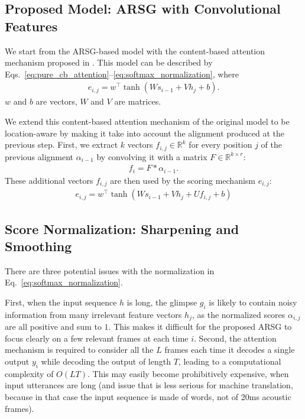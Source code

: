 \documentclass{article}
\begin{document}
\subsection{Proposed Model: ARSG with Convolutional Features}

We start from the ARSG-based model with the content-based attention mechanism
proposed in \cite{bahdanau_neural_2014}. This model can be described by
Eqs.~\eqref{eq:pure_cb_attention}--\eqref{eq:softmax_normalization}, where 
\begin{align}
e_{i,j} = w^\top \tanh(W s_{i-1} + V h_j + b).
\label{eq:base_attention}
\end{align}
$w$ and $b$ are vectors, $W$ and $V$ are matrices. 





We extend this content-based attention mechanism of the original model to be
location-aware by making it take into account the alignment produced at the
previous step. First, we extract $k$ vectors $f_{i,j} \in \mathbb{R}^{k}$ for
every position $j$ of the previous alignment $\alpha_{i-1}$  by convolving it
with a matrix $F \in \mathbb{R}^{k \times r}$:
\begin{align}
    \label{eq:conv_feats}
    f_i = F * \alpha_{i-1}.
\end{align}
These additional vectors $f_{i,j}$ are then used by the scoring mechanism $e_{i,j}$:
\begin{align}
    \label{eq:hybrid_score}
    e_{i,j} = w^\top \tanh(W s_{i-1} + V h_j + U f_{i,j} + b)
\end{align}







\subsection{Score Normalization: Sharpening and Smoothing}
\label{sec:sharpening}

There are three potential issues with the normalization in
Eq.~\eqref{eq:softmax_normalization}. 

First, when the input sequence $h$ is long, the glimpse $g_i$ is likely to
contain noisy information from many irrelevant feature vectors $h_j$, as the
normalized scores $\alpha_{i,j}$ are all positive and sum to $1$. This makes it
difficult for the proposed ARSG to focus clearly on a few relevant frames at
each time $i$. Second, the attention mechanism is required to consider all the
$L$ frames each time it decodes a single output $y_i$ while decoding the output
of length $T$, leading to a computational complexity of $O(LT)$. This may
easily become prohibitively expensive, when input utterances are long
(and issue that is less serious for machine translation, because in that
case the input sequence is made of words, not of 20ms acoustic frames).
\end{document}

